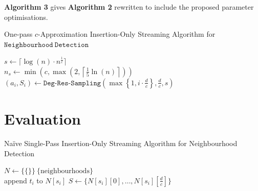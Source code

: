 \documentclass[11pt,twoside,a4paper]{report}
\begin{document}
\par \textbf{Algorithm 3} gives \textbf{Algorithm 2} rewritten to include the proposed parameter optimisations.
\begin{algorithm}
	\caption{One-pass $c$-Approximation Insertion-Only Streaming Algorithm for $\mathtt{Neighbourhood\ Detection}$}
	$s\leftarrow\lceil\log(n)\cdot n^{\frac1c}\rceil$\\
	$n_s\leftarrow\min\left(c,\max\left(2,\left\lceil\frac15\ln(n)\right\rceil\right)\right)$\\
	 {
		$(a_i,S_i)\leftarrow\mathtt{Deg}\mbox{-}\mathtt{Res}\mbox{-}\mathtt{Sampling}\left(\max\left\{1,i\cdot\frac{d}{c}\right\},\frac{d}c,s\right)$
	}
\end{algorithm}

\section{Evaluation}


\begin{algorithm}
	\caption{Na\"ive Single-Pass Insertion-Only Streaming Algorithm for Neighbourhood Detection}
	$N\leftarrow\{\{\}\}\ \{\text{neighbourhoods}\}$\\
	 {
		append $t_i$ to $N[s_i]$
		 {
			$S\leftarrow \{N[s_i][0],\dots,N[s_i][\frac{d}{c}]\}$
		}
	}
\end{algorithm}
\end{document}
